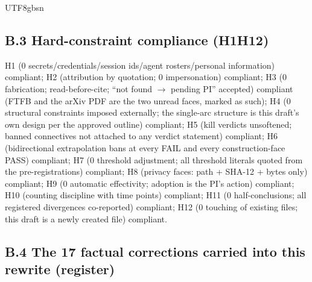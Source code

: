 \documentclass[11pt,letterpaper]{article}
\begin{document}
\begin{CJK}{UTF8}{gbsn}
\subsection*{B.3 Hard-constraint compliance (H1\textendash{}H12)}

H1 (0 secrets/credentials/session ids/agent rosters/personal information) \textemdash{} compliant; H2 (attribution by quotation; 0 impersonation) \textemdash{} compliant; H3 (0 fabrication; read-before-cite; ``not found \ensuremath{\to} pending PI'' accepted) \textemdash{} compliant (FTFB and the arXiv PDF are the two unread faces, marked as such); H4 (0 structural constraints imposed externally; the single-arc structure is this draft's own design per the approved outline) \textemdash{} compliant; H5 (kill verdicts unsoftened; banned connectives not attached to any verdict statement) \textemdash{} compliant; H6 (bidirectional extrapolation bans at every FAIL and every construction-face PASS) \textemdash{} compliant; H7 (0 threshold adjustment; all threshold literals quoted from the pre-registrations) \textemdash{} compliant; H8 (privacy faces: path + SHA-12 + bytes only) \textemdash{} compliant; H9 (0 automatic effectivity; adoption is the PI's action) \textemdash{} compliant; H10 (counting discipline with time points) \textemdash{} compliant; H11 (0 half-conclusions; all registered divergences co-reported) \textemdash{} compliant; H12 (0 touching of existing files; this draft is a newly created file) \textemdash{} compliant.

\subsection*{B.4 The 17 factual corrections carried into this rewrite (register)}


\end{CJK}
\end{document}
